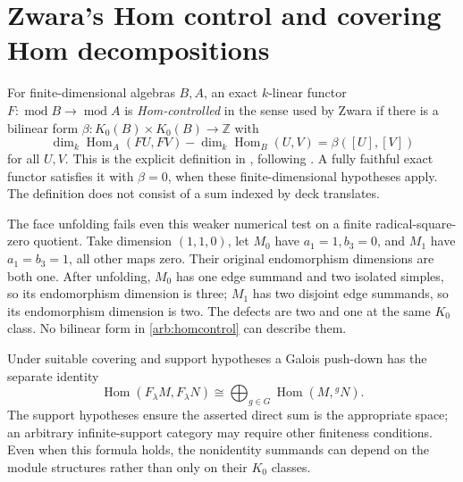 \documentclass[11pt,oneside,openany]{book}
\theoremstyle{definition}\newtheorem{definition}[theorem]{Definition}
\theoremstyle{remark}\newtheorem{remark}[theorem]{Remark}
\begin{document}
\section[Hom control and coverings]{Zwara's Hom control and covering Hom decompositions}
For finite-dimensional algebras $B,A$, an exact $k$-linear functor
$F:\operatorname{mod}B\to\operatorname{mod}A$ is \emph{Hom-controlled} in the
sense used by Zwara if there is a bilinear form
$\beta:K_0(B)\times K_0(B)\to\mathbb Z$ with
\begin{equation}\label{arb:homcontrol}
 \dim_k\operatorname{Hom}_A(FU,FV)-\dim_k\operatorname{Hom}_B(U,V)
       =\beta([U],[V])
\end{equation}
for all $U,V$. This is the explicit definition in
\cite[Section 6, p.71]{ARBRiedtmannZwara}, following \cite{ARBZwara}.
A fully faithful exact functor satisfies it with $\beta=0$, when these
finite-dimensional hypotheses apply. The definition does not consist of a
sum indexed by deck translates.

The face unfolding fails even this weaker numerical test on a finite
radical-square-zero quotient. Take dimension $(1,1,0)$, let $M_0$ have
$a_1=1,b_3=0$, and $M_1$ have $a_1=b_3=1$, all other maps zero. Their original
endomorphism dimensions are both one. After unfolding, $M_0$ has one edge
summand and two isolated simples, so its endomorphism dimension is three;
$M_1$ has two disjoint edge summands, so its endomorphism dimension is two.
The defects are two and one at the same $K_0$ class. No bilinear form in
\eqref{arb:homcontrol} can describe them.

Under suitable covering and support hypotheses a Galois push-down has the
separate identity
\[
 \operatorname{Hom}(F_\lambda M,F_\lambda N)
   \cong\bigoplus_{g\in G}\operatorname{Hom}(M,{}^gN).
\]
The support hypotheses ensure the asserted direct sum is the appropriate
space; an arbitrary infinite-support category may require other finiteness
conditions. Even when this formula holds, the nonidentity summands can depend
on the module structures rather than only on their $K_0$ classes.
\end{document}
